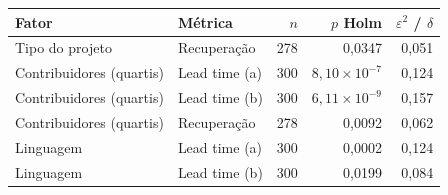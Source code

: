 \begin{tabular}{llrrr}
\hline
Fator & Métrica & $n$ & $p$ Holm & $\varepsilon^2$ / $\delta$ \\
\hline
Tipo do projeto & Recuperação & 278 & 0,0347 & 0,051 \\
Contribuidores (quartis) & Lead time (a) & 300 & $8,10\times 10^{-7}$ & 0,124 \\
Contribuidores (quartis) & Lead time (b) & 300 & $6,11\times 10^{-9}$ & 0,157 \\
Contribuidores (quartis) & Recuperação & 278 & 0,0092 & 0,062 \\
Linguagem & Lead time (a) & 300 & 0,0002 & 0,124 \\
Linguagem & Lead time (b) & 300 & 0,0199 & 0,084 \\
\hline
\end{tabular}
